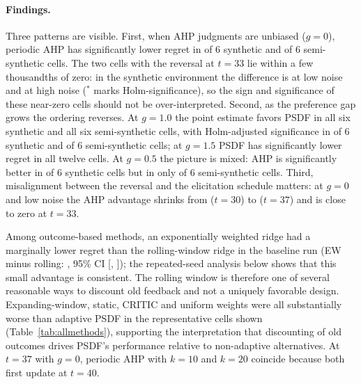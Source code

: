 \documentclass[12pt,a4paper]{article}
\begin{document}
\begin{table}[t]
\centering\small
\caption{Regime map, semi-synthetic environment (real provincial features). Same layout as Table~\ref{tab:regime-syn}.}\label{tab:regime-semi}
\end{table}

\begin{table}[t]
\centering\small
\caption{Mean expected regret for all methods in four representative cells (synthetic; noise SD 0.05 except the last column).}\label{tab:allmethods}

\end{table}

\paragraph{Findings.} Three patterns are visible. First, when AHP judgments are unbiased ($g=0$), periodic AHP has significantly lower regret in \SynNegSigZero{} of 6 synthetic and \SemiNegSigZero{} of 6 semi-synthetic cells. The two cells with the reversal at $t=33$ lie within a few thousandths of zero: in the synthetic environment the difference is \SynCellLowRevBGapA{} at low noise and \SynCellHighRevBGapA{} at high noise ($^{*}$ marks Holm-significance), so the sign and significance of these near-zero cells should not be over-interpreted. Second, as the preference gap grows the ordering reverses. At $g=1.0$ the point estimate favors PSDF in all six synthetic and all six semi-synthetic cells, with Holm-adjusted significance in \SynPosSigOne{} of 6 synthetic and \SemiPosSigOne{} of 6 semi-synthetic cells; at $g=1.5$ PSDF has significantly lower regret in all twelve cells. At $g=0.5$ the picture is mixed: AHP is significantly better in \SynNegSigHalf{} of 6 synthetic cells but in only \SemiNegSigHalf{} of 6 semi-synthetic cells. Third, misalignment between the reversal and the elicitation schedule matters: at $g=0$ and low noise the AHP advantage shrinks from \AHPAdvEarly{} ($t=30$) to \AHPShrinkLate{} ($t=37$) and is close to zero at $t=33$.

Among outcome-based methods, an exponentially weighted ridge had a marginally lower regret than the rolling-window ridge in the baseline run (EW minus rolling: \EWDiff, 95\% CI [\EWLo, \EWHi]); the repeated-seed analysis below shows that this small advantage is consistent. The rolling window is therefore one of several reasonable ways to discount old feedback and not a uniquely favorable design. Expanding-window, static, CRITIC and uniform weights were all substantially worse than adaptive PSDF in the representative cells shown (Table~\ref{tab:allmethods}), supporting the interpretation that discounting of old outcomes drives PSDF's performance relative to non-adaptive alternatives. At $t=37$ with $g=0$, periodic AHP with $k=10$ and $k=20$ coincide because both first update at $t=40$.
\end{document}
